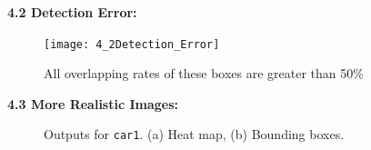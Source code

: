 \documentclass{assignment}
\begin{document}
\begin{problemlist}
\textbf{4.2 Detection Error:}
\begin{figure}[H]
\begin{center}
    \texttt{[image: 4\_2Detection\_Error]}
    \caption{All overlapping rates of these boxes are greater than 50\%}
    \label{fig:4_2}
\end{center}
\end{figure}

\newpage
\textbf{4.3 More Realistic Images:}
\begin{figure}[H]
    \begin{center}
        \hspace{0.5cm}
        \caption{Outputs for \texttt{car1}. (a) Heat map, (b) Bounding boxes.}
        \label{fig:4_3car1_images}
    \end{center}
\end{figure}
\begin{figure}[H]
    \begin{center}

\end{center}
\end{figure}
\end{problemlist}
\end{document}
